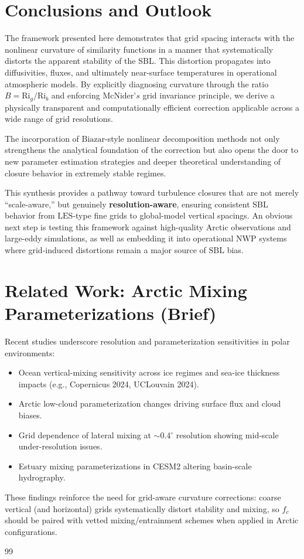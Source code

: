 \documentclass[12pt, a4paper]{article}
\begin{document}
\section{Conclusions and Outlook}

The framework presented here demonstrates that grid spacing interacts with the nonlinear curvature of similarity functions in a manner that systematically distorts the apparent stability of the SBL. This distortion propagates into diffusivities, fluxes, and ultimately near-surface temperatures in operational atmospheric models. By explicitly diagnosing curvature through the ratio $B=\text{Ri}_g/\text{Ri}_b$ and enforcing $\text{McNider}’s$ grid invariance principle, we derive a physically transparent and computationally efficient correction applicable across a wide range of grid resolutions.

The incorporation of $\text{Biazar}$-style nonlinear decomposition methods not only strengthens the analytical foundation of the correction but also opens the door to new parameter estimation strategies and deeper theoretical understanding of closure behavior in extremely stable regimes.

This synthesis provides a pathway toward turbulence closures that are not merely “scale-aware,” but genuinely \textbf{resolution-aware}, ensuring consistent SBL behavior from $\text{LES}$-type fine grids to global-model vertical spacings. An obvious next step is testing this framework against high-quality Arctic observations and large-eddy simulations, as well as embedding it into operational $\text{NWP}$ systems where grid-induced distortions remain a major source of $\text{SBL}$ bias.

\section{Related Work: Arctic Mixing Parameterizations (Brief)}
Recent studies underscore resolution and parameterization sensitivities in polar environments:
\begin{itemize}
    \item Ocean vertical-mixing sensitivity across ice regimes and sea-ice thickness impacts (e.g., Copernicus 2024, UCLouvain 2024).\cite{copernicus2024mixing}
    \item Arctic low-cloud parameterization changes driving surface flux and cloud biases.\cite{agu2024lowcloud}
    \item Grid dependence of lateral mixing at $\sim$0.4$^\circ$ resolution showing mid-scale under-resolution issues.\cite{sciencedirect2007lateral}
    \item Estuary mixing parameterizations in CESM2 altering basin-scale hydrography.\cite{ams2024estuary}
\end{itemize}
These findings reinforce the need for grid-aware curvature corrections: coarse vertical (and horizontal) grids systematically distort stability and mixing, so $f_c$ should be paired with vetted mixing/entrainment schemes when applied in Arctic configurations.


\begin{thebibliography}{99}

\end{thebibliography}
\end{document}
